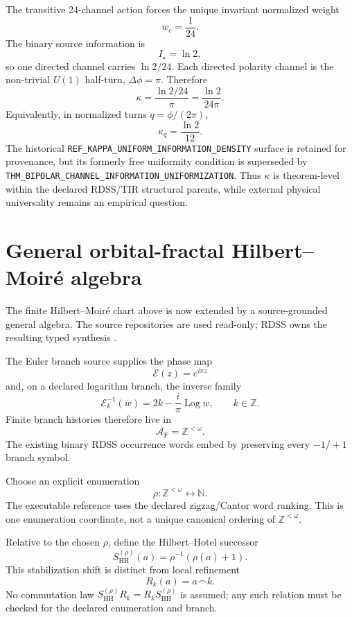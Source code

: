 \documentclass[11pt]{article}
\newcommand{\claimid}[1]{\nolinkurl{#1}}
\begin{document}
The transitive 24-channel action forces the unique invariant normalized weight
\[
w_c=\frac1{24}.
\]
The binary source information is
\[
I_\star=\ln2,
\]
so one directed channel carries \(\ln2/24\). Each directed polarity channel
is the non-trivial \(U(1)\) half-turn, \(\Delta\phi=\pi\). Therefore
\[
\boxed{
\kappa
=
\frac{\ln2/24}{\pi}
=
\frac{\ln2}{24\pi}.
}
\]
Equivalently, in normalized turns \(q=\phi/(2\pi)\),
\[
\boxed{
\kappa_q=\frac{\ln2}{12}.
}
\]
The historical
\claimid{REF_KAPPA_UNIFORM_INFORMATION_DENSITY}
surface is retained for provenance, but its formerly free uniformity condition
is superseded by
\claimid{THM_BIPOLAR_CHANNEL_INFORMATION_UNIFORMIZATION}.
Thus \(\kappa\) is theorem-level within the declared RDSS/TIR structural
parents, while external physical universality remains an empirical question.

\section{General orbital-fractal Hilbert--Moir\'e algebra}

The finite Hilbert--Moir\'e chart above is now extended by a source-grounded
general algebra. The source repositories are used read-only; RDSS owns the
resulting typed synthesis \cite{LipaInfinities2026,LipaGREMLIN2026,LipaIDT2026}.

The Euler branch source supplies the phase map
\[
\mathcal E(z)=e^{i\pi z}
\]
and, on a declared logarithm branch, the inverse family
\[
\boxed{
\mathcal E_k^{-1}(w)
=
2k-\frac{i}{\pi}\operatorname{Log} w,
\qquad k\in\mathbb Z.
}
\]
Finite branch histories therefore live in
\[
\boxed{
\mathcal A_{\mathrm F}
=
\mathbb Z^{<\omega}.
}
\]
The existing binary RDSS occurrence words embed by preserving every
\(-1/+1\) branch symbol.

Choose an explicit enumeration
\[
\rho:\mathbb Z^{<\omega}\longleftrightarrow\mathbb N.
\]
The executable reference uses the declared zigzag/Cantor word ranking. This is
one enumeration coordinate, not a unique canonical ordering of
\(\mathbb Z^{<\omega}\).

Relative to the chosen \(\rho\), define the Hilbert--Hotel successor
\[
\boxed{
S_{\mathrm{HH}}^{(\rho)}(a)
=
\rho^{-1}\!\left(\rho(a)+1\right).
}
\]
This stabilization shift is distinct from local refinement
\[
R_k(a)=a\frown k.
\]
No commutation law
\(S_{\mathrm{HH}}^{(\rho)}R_k=R_kS_{\mathrm{HH}}^{(\rho)}\)
is assumed; any such relation must be checked for the declared enumeration
and branch.
\end{document}
